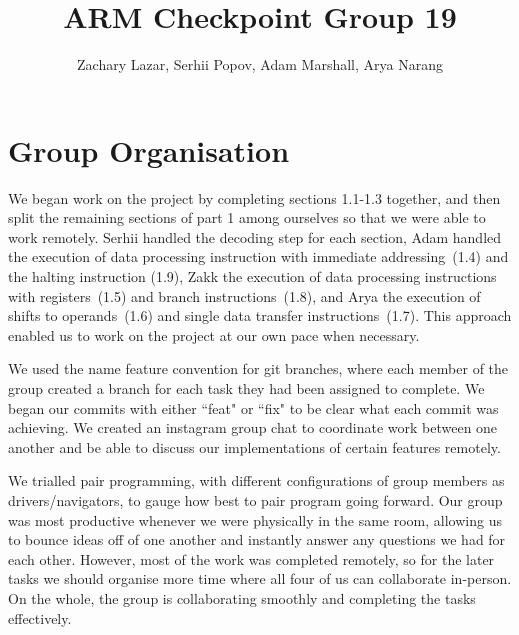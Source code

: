 \documentclass[11pt]{article}
\begin{document}
\title{ARM Checkpoint Group 19}
\author{Zachary Lazar, Serhii Popov, Adam Marshall, Arya Narang}

\maketitle

\section{Group Organisation}
We began work on the project by completing sections 1.1-1.3 together, and then split the remaining sections
of part 1 among ourselves so that we were able to work remotely. Serhii handled the decoding step for each section,
Adam handled the execution of data processing instruction with immediate addressing~(1.4) and the halting instruction (1.9),
Zakk the execution of data processing instructions with registers~(1.5) and branch instructions~(1.8), 
and Arya the execution of shifts to operands~(1.6) and single data transfer instructions~(1.7). This approach
enabled us to work on the project at our own pace when necessary.

We used the name feature convention for git branches, where each member of the group created a branch for each task
they had been assigned to complete. We began our commits with either ``feat" or ``fix" to be clear what each commit 
was achieving. We created an instagram group chat to coordinate work between one another and be able to discuss
our implementations of certain features remotely.

We trialled pair programming, with different configurations of group members as drivers/navigators, to gauge
how best to pair program going forward. Our group was most productive whenever we were physically in the same room,
allowing us to bounce ideas off of one another and instantly answer any questions we had for each other. However,
most of the work was completed remotely, so for the later tasks we should organise more time
where all four of us can collaborate in-person. On the whole, the group is collaborating smoothly and completing
the tasks effectively.
\end{document}
